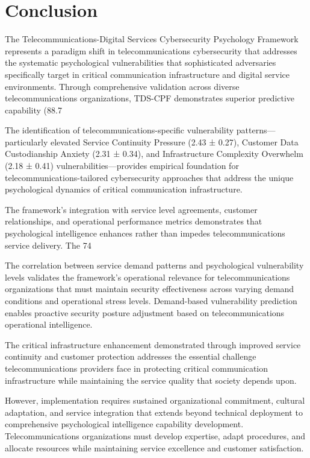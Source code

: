 \documentclass[10pt, twocolumn]{article}
\begin{document}
\section{Conclusion}

The Telecommunications-Digital Services Cybersecurity Psychology Framework represents a paradigm shift in telecommunications cybersecurity that addresses the systematic psychological vulnerabilities that sophisticated adversaries specifically target in critical communication infrastructure and digital service environments. Through comprehensive validation across diverse telecommunications organizations, TDS-CPF demonstrates superior predictive capability (88.7%

The identification of telecommunications-specific vulnerability patterns—particularly elevated Service Continuity Pressure (2.43 ± 0.27), Customer Data Custodianship Anxiety (2.31 ± 0.34), and Infrastructure Complexity Overwhelm (2.18 ± 0.41) vulnerabilities—provides empirical foundation for telecommunications-tailored cybersecurity approaches that address the unique psychological dynamics of critical communication infrastructure.

The framework's integration with service level agreements, customer relationships, and operational performance metrics demonstrates that psychological intelligence enhances rather than impedes telecommunications service delivery. The 74%

The correlation between service demand patterns and psychological vulnerability levels validates the framework's operational relevance for telecommunications organizations that must maintain security effectiveness across varying demand conditions and operational stress levels. Demand-based vulnerability prediction enables proactive security posture adjustment based on telecommunications operational intelligence.

The critical infrastructure enhancement demonstrated through improved service continuity and customer protection addresses the essential challenge telecommunications providers face in protecting critical communication infrastructure while maintaining the service quality that society depends upon.

However, implementation requires sustained organizational commitment, cultural adaptation, and service integration that extends beyond technical deployment to comprehensive psychological intelligence capability development. Telecommunications organizations must develop expertise, adapt procedures, and allocate resources while maintaining service excellence and customer satisfaction.
\end{document}
